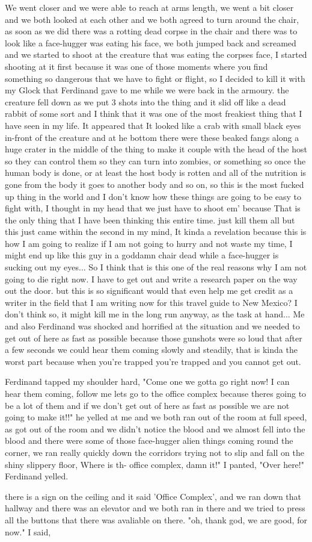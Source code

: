\documentclass[14pt,letterpaper]{book}
\begin{document}
We went closer and we were able to reach at arms length, we went a bit closer and we both looked at each other and we both agreed to turn around the chair, as soon as we did there was a rotting dead corpse in the chair and there was to look like a face-hugger was eating his face, we both jumped back and screamed and we started to shoot at the creature that was eating the corpses face, I started shooting at it first because it was one of those moments where you find something so dangerous that we have to fight or flight, so I decided to kill it with my Glock that Ferdinand gave to me while we were back in the armoury. the creature fell down as we put 3 shots into the thing and it slid off like a dead rabbit of some sort and I think that it was one of the most freakiest thing that I have seen in my life. It appeared that It looked like a crab with small black eyes in-front of the creature and at he bottom there were these beaked fangs along a huge crater in the middle of the thing to make it couple with the head of the host so they can control them so they can turn into zombies, or something so once the human body  is done, or at least the host body is rotten and all of the nutrition is gone from the body it goes to another body and so on, so this is the most fucked up thing in the world and I don't know how these things are going to be easy to fight with, I thought in my head that we just have to shoot em' because That is the only thing that I have been thinking this entire time. just kill them all but this just came within the second in my mind, It kinda a revelation because this is how I am going to realize if I am not going to hurry and not waste my time, I might end up like this guy in a goddamn chair dead while a face-hugger is sucking out my eyes... So I think that is this one of the real reasons why I am not going to die right now. I have to get out and write a research paper on the way out the door. but this is so significant would that even help me get credit as a writer in the field that I am writing now for this travel guide to New Mexico? I don't think so, it might kill me in the long run anyway, as the task at hand... Me and also Ferdinand was shocked and horrified at the situation and we needed to get out of here as fast as possible because those gunshots were so loud that after a few seconds we could hear them coming slowly and steadily, that is kinda the worst part because when you're trapped you're trapped and you cannot get out.

Ferdinand tapped my shoulder hard, "Come one we gotta go right now! I can hear them coming, follow me lets go to the office complex because theres going to be a lot of them and if we don't get out of here as fast as possible we are not going to make it!!" he yelled at me and we both ran out of the room at full speed, as got out of the room and we didn't notice the blood and we almost fell into the blood and there were some of those face-hugger alien things coming round the corner, we ran really quickly down the corridors trying not to slip and fall on the shiny slippery floor, Where is th- office complex, damn it!" I panted, "Over here!" Ferdinand yelled.

there is a sign on the ceiling and it said 'Office Complex', and we ran down that hallway and there was an elevator and we both ran in there and we tried to press all the buttons that there was avaliable on there. "oh, thank god, we are good, for now." I said, 
\end{document}
